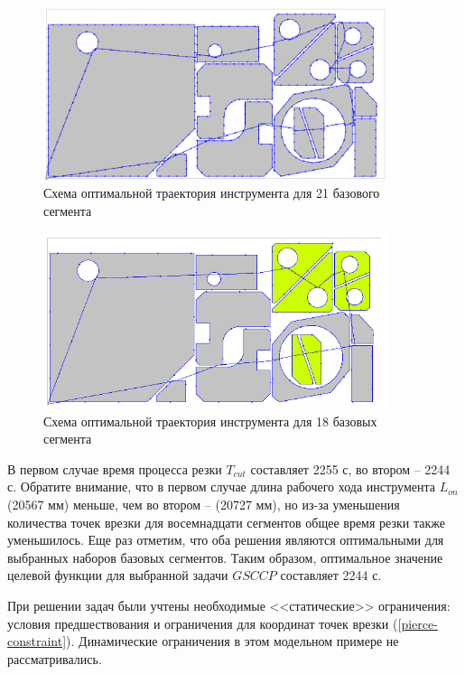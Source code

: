 \documentclass[11pt,twoside,openany]{report}
\begin{document}
\begin{figure}[h]
  \begin{center}
  \includegraphics[width=0.9\textwidth]{path21.png}
  \caption{Схема оптимальной траектория инструмента для 21 базового сегмента}
  \label{path21}
  \end{center}
\end{figure}

\begin{figure}[h]
  \begin{center}
  \includegraphics[width=0.9\textwidth]{path18.png}
  \caption{Схема оптимальной траектория инструмента для 18 базовых сегмента}
  \label{path18}
  \end{center}
\end{figure}

В первом случае время процесса резки
$T_{cut}$
составляет 2255 с,
во втором -- 2244 с.
Обратите внимание, что в первом случае длина рабочего хода инструмента
$L_{on}$
(20567 мм) меньше, чем во втором -- (20727 мм),
но из-за уменьшения количества точек врезки
для восемнадцати сегментов общее время резки также уменьшилось.
Еще раз отметим, что оба решения являются оптимальными
для выбранных наборов базовых сегментов.
Таким образом, оптимальное значение целевой
функции для выбранной задачи $GSCCP$ составляет 2244 с.

При решении задач были учтены необходимые <<статические>> ограничения:
условия предшествования и ограничения для координат
точек врезки (\ref{pierce-constraint}).
Динамические ограничения в этом модельном примере не рассматривались.
\end{document}
